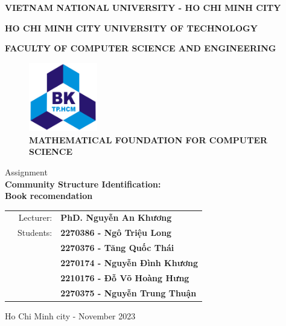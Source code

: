 
\begin{titlepage}
\centerline{\bf \normalsize VIETNAM NATIONAL UNIVERSITY - HO CHI MINH CITY}
\centerline{\bf \normalsize HO CHI MINH CITY UNIVERSITY OF TECHNOLOGY}
\centerline{\bf \normalsize FACULTY OF COMPUTER SCIENCE AND ENGINEERING}
\vspace*{1cm}
\begin{figure}[h!]
	\begin{center}
		\includegraphics[width=3cm]{image/bku.png}
		\\
		\vspace{.5cm}
		\LARGE \textbf{MATHEMATICAL FOUNDATION FOR COMPUTER SCIENCE}
	\end{center}
\end{figure}

\begin{center}
    \Large Assignment
    \\
    \LARGE \textbf{Community Structure Identification:\\Book recomendation} \\
\end{center}

\vspace{3em}

\begin{table}[h]
\begin{tabular}{rrl}
\hspace{2.5 cm} & Lecturer: & \bf PhD. Nguyễn An Khương\\
& Students:  & \bf 2270386 - Ngô Triệu Long\\
& & \bf 2270376 - Tăng Quốc Thái\\
& & \bf 2270174 - Nguyễn Đình Khương\\
& & \bf 2210176 - Đỗ Võ Hoàng Hưng\\
& & \bf 2270375 - Nguyễn Trung Thuận\\
\end{tabular}
\end{table}

\vspace{2.5em}

\vfill
\begin{center}
	{\normalsize Ho Chi Minh city - November 2023}
\end{center}
\end{titlepage}


\newpage

\thispagestyle{empty}
